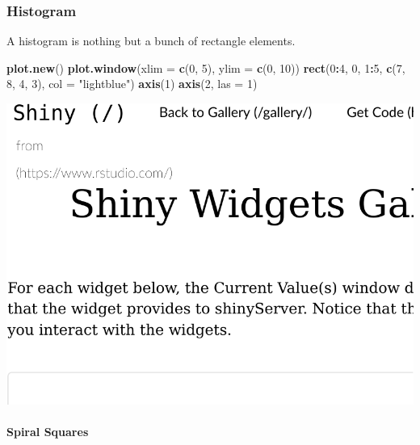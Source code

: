 \documentclass[]{book}
\newenvironment{Shaded}{\begin{snugshade}}{\end{snugshade}}
\newcommand{\KeywordTok}[1]{\textcolor[rgb]{0.13,0.29,0.53}{\textbf{#1}}}
\newcommand{\DataTypeTok}[1]{\textcolor[rgb]{0.13,0.29,0.53}{#1}}
\newcommand{\DecValTok}[1]{\textcolor[rgb]{0.00,0.00,0.81}{#1}}
\newcommand{\StringTok}[1]{\textcolor[rgb]{0.31,0.60,0.02}{#1}}
\newcommand{\OperatorTok}[1]{\textcolor[rgb]{0.81,0.36,0.00}{\textbf{#1}}}
\newcommand{\NormalTok}[1]{#1}
\let\oldparagraph\paragraph
\renewcommand{\paragraph}[1]{\oldparagraph{#1}\mbox{}}
\theoremstyle{definition}
\theoremstyle{definition}
\theoremstyle{definition}
\theoremstyle{remark}
\begin{document}
\subsubsection{Histogram}\label{histogram}

A histogram is nothing but a bunch of rectangle elements.

\begin{Shaded}
\begin{Highlighting}[]
\KeywordTok{plot.new}\NormalTok{()}
\KeywordTok{plot.window}\NormalTok{(}\DataTypeTok{xlim =} \KeywordTok{c}\NormalTok{(}\DecValTok{0}\NormalTok{, }\DecValTok{5}\NormalTok{), }\DataTypeTok{ylim =} \KeywordTok{c}\NormalTok{(}\DecValTok{0}\NormalTok{, }\DecValTok{10}\NormalTok{))}
\KeywordTok{rect}\NormalTok{(}\DecValTok{0}\OperatorTok{:}\DecValTok{4}\NormalTok{, }\DecValTok{0}\NormalTok{, }\DecValTok{1}\OperatorTok{:}\DecValTok{5}\NormalTok{, }\KeywordTok{c}\NormalTok{(}\DecValTok{7}\NormalTok{, }\DecValTok{8}\NormalTok{, }\DecValTok{4}\NormalTok{, }\DecValTok{3}\NormalTok{), }\DataTypeTok{col =} \StringTok{"lightblue"}\NormalTok{)}
\KeywordTok{axis}\NormalTok{(}\DecValTok{1}\NormalTok{)}
\KeywordTok{axis}\NormalTok{(}\DecValTok{2}\NormalTok{, }\DataTypeTok{las =} \DecValTok{1}\NormalTok{)}
\end{Highlighting}
\end{Shaded}

\includegraphics[width=0.5\linewidth]{Rcourse_files/figure-latex/unnamed-chunk-260-1}

\paragraph{Spiral Squares}\label{spiral-squares}
\end{document}
